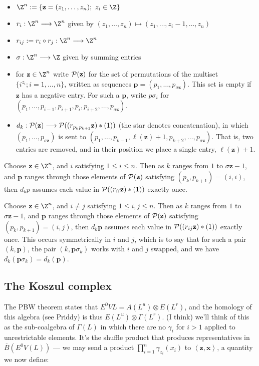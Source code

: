 \documentclass[11pt]{article}
\begin{document}
\begin{PRlieKoszulComplexCalculation}
\begin{itemize}
\setlength{\parindent}{.25in}
\item $\Z^n:=\{\textbf{z}=(z_1,\ldots,z_n);\ z_i\in\Z\}$
\item $r_i:\Z^n\to\Z^n$ given by $(z_1,\ldots,z_n)\mapsto(z_1,\ldots,z_i-1,\ldots,z_n)$
\item $r_{ij}:=r_i\circ r_j:\Z^n\to\Z^n$
\item $\sigma:\Z^n\to\Z$ given by summing entries
\item for $\textbf{z}\in\Z^n$ write $\mathcal{P}(\textbf{z})$ for the set of permutations of the multiset $\{i^{z_i};i=1,\ldots,n\}$, written as sequences $\textbf{p}=(p_1,\ldots,p_{\sigma \textbf{z}})$. This set is empty if $\textbf{z}$ has a negative entry. For such a $\textbf{p}$, write $p\sigma_i$ for $(p_1,\ldots,p_{i-1},p_{i+1},p_{i},p_{i+2},\ldots,p_{\sigma \textbf{z}})$.
\item $d_k:\mathcal{P}(\textbf{z})\longrightarrow\mathcal{P}((r_{p_kp_{k+1}}\textbf{z})*(1))$ (the star denotes concatenation), in which $(p_1,\ldots,p_{\sigma \textbf{z}})$ is sent to $(p_1,\ldots,p_{k-1},\ell(\textbf{z})+1,p_{k+2},\ldots,p_{\sigma \textbf{z}})$. That is, two entries are removed, and in their position we place a single entry, $\ell(\textbf{z})+1$.
\end{itemize}
\begin{prop*}
Choose $\textbf{z}\in\Z^n$, and $i$ satisfying $1\leq i\leq n$. Then as $k$ ranges from $1$ to $\sigma \textbf{z}-1$, and $\textbf{p}$ ranges through those elements of $\mathcal{P}(\textbf{z})$ satisfying $(p_k,p_{k+1})=(i,i)$, then $d_kp$ assumes each value in $\mathcal{P}((r_{ii}\textbf{z})*(1))$ exactly once.
\end{prop*}
\begin{prop*}
Choose $\textbf{z}\in\Z^n$, and $i\neq j$ satisfying $1\leq i,j\leq n$. Then as $k$ ranges from $1$ to $\sigma \textbf{z}-1$, and $\textbf{p}$ ranges through those elements of $\mathcal{P}(\textbf{z})$ satisfying $(p_k,p_{k+1})=(i,j)$, then $d_k\textbf{p}$ assumes each value in $\mathcal{P}((r_{ij}\textbf{z})*(1))$ exactly once. This occurs symmetrically in $i$ and $j$, which is to say that for such a pair $(k,\textbf{p})$, the pair $(k,\textbf{p}\sigma_k)$ works with $i$ and $j$ swapped, and we have $d_k(\textbf{p}\sigma_k)=d_k(\textbf{p})$.
\end{prop*}

\subsection*{The Koszul complex}
The PBW theorem states that $E^0VL=A(L^u)\otimes E(L^r)$, and the homology of this algebra (see Priddy) is thus $E(L^u)\otimes \Gamma(L^r)$. (I think) we'll think of this as the sub-coalgebra of $\Gamma(L)$ in which there are no $\gamma_i$ for $i>1$ applied to unrestrictable elements. It's the shuffle product that produces representatives in $\overline{B}(E^0V(L))$ --- we may send a product $\prod_{i=1}^{n}\gamma_{z_i}(x_i)$ to $\left\langle \textbf{z},\textbf{x}\right\rangle$, a quantity we now define:


\end{PRlieKoszulComplexCalculation}
\end{document}
